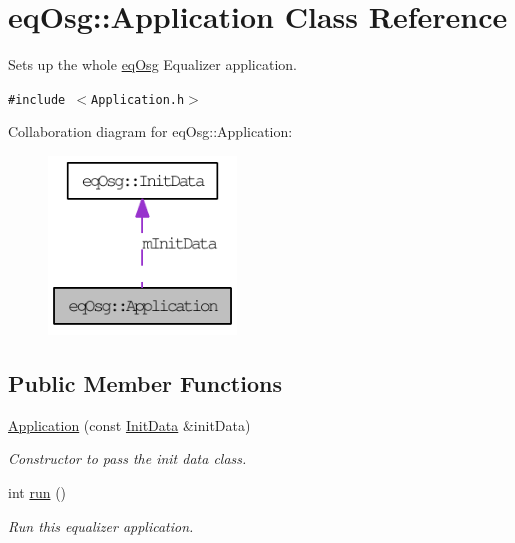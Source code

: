 \hypertarget{a00001}{
\section{eqOsg::Application Class Reference}
\label{a00001}
}
Sets up the whole \hyperlink{a00045}{eqOsg} Equalizer application.  


{\tt \#include $<$Application.h$>$}

Collaboration diagram for eqOsg::Application:\nopagebreak
\begin{figure}[H]
\begin{center}
\leavevmode
\includegraphics[width=142pt]{a00083}
\end{center}
\end{figure}
\subsection*{Public Member Functions}
\begin{CompactItemize}
\item 
\hyperlink{a00001_004ad4bb523a1a7ffe7a3e53c3eb82e2}{Application} (const \hyperlink{a00011}{InitData} \&initData)
\begin{CompactList}\small\item\em Constructor to pass the init data class. \item\end{CompactList}\item 
\hypertarget{a00001_8cf8941c8db90117d3735bce5ae1fdf4}{
int \hyperlink{a00001_8cf8941c8db90117d3735bce5ae1fdf4}{run} ()}
\label{a00001_8cf8941c8db90117d3735bce5ae1fdf4}

\begin{CompactList}\small\item\em Run this equalizer application. \item\end{CompactList}\end{CompactItemize}
